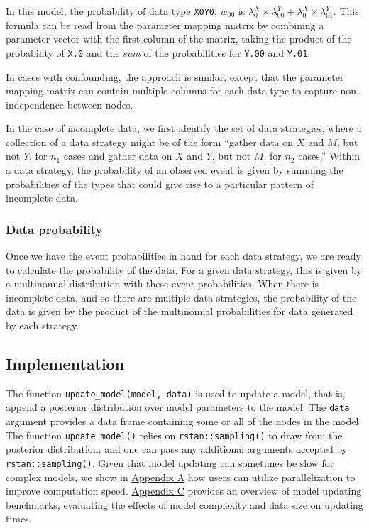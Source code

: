 \documentclass[
  11pt,
  article]{jss}
\begin{document}
In this model, the probability of data type \texttt{X0Y0}, \(w_{00}\) is
\(\lambda^X_0\times \lambda^Y_{00} + \lambda^X_0\times \lambda^Y_{01}\).
This formula can be read from the parameter mapping matrix by combining
a parameter vector with the first column of the matrix, taking the
product of the probability of \texttt{X.0} and the \emph{sum} of the
probabilities for \texttt{Y.00} and \texttt{Y.01}.

In cases with confounding, the approach is similar, except that the
parameter mapping matrix can contain multiple columns for each data type
to capture non-independence between nodes.

In the case of incomplete data, we first identify the set of data
strategies, where a collection of a data strategy might be of the form
``gather data on \(X\) and \(M\), but not \(Y\), for \(n_1\) cases and
gather data on \(X\) and \(Y\), but not \(M\), for \(n_2\) cases.''
Within a data strategy, the probability of an observed event is given by
summing the probabilities of the types that could give rise to a
particular pattern of incomplete data.

\subsubsection{Data probability}\label{data-probability}

Once we have the event probabilities in hand for each data strategy, we
are ready to calculate the probability of the data. For a given data
strategy, this is given by a multinomial distribution with these event
probabilities. When there is incomplete data, and so there are multiple
data strategies, the probability of the data is given by the product of
the multinomial probabilities for data generated by each strategy.

\subsection{Implementation}\label{implementation}

The function \texttt{update\_model(model,\ data)} is used to update a
model, that is, append a posterior distribution over model parameters to
the model. The \texttt{data} argument provides a data frame containing
some or all of the nodes in the model. The function
\texttt{update\_model()} relies on \texttt{rstan::sampling()} to draw
from the posterior distribution, and one can pass any additional
arguments accepted by \texttt{rstan::sampling()}. Given that model
updating can sometimes be slow for complex models, we show in
\hyperref[sec-parallel]{Appendix A} how users can utilize
parallelization to improve computation speed.
\hyperref[sec-benchmark]{Appendix C} provides an overview of model
updating benchmarks, evaluating the effects of model complexity and data
size on updating times.
\end{document}
